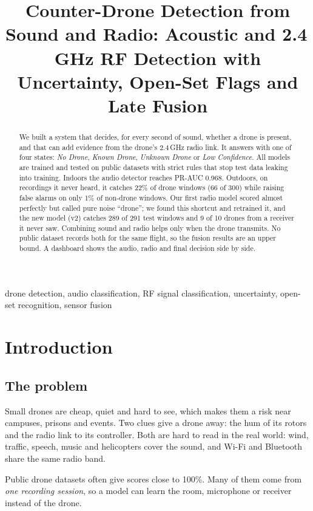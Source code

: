 \documentclass[conference,a4paper]{IEEEtran}
\title{Counter-Drone Detection from Sound and Radio: Acoustic and 2.4\,GHz RF Detection
with Uncertainty, Open-Set Flags and Late Fusion}
\author{\IEEEauthorblockN{Vidhi Rojasara (AU2644022) \qquad Kathan Desai (AU2644002)}
\IEEEauthorblockA{AI Lab, Course Instructor: Prof.\ Maitrik Shah\\
Ahmedabad University, Ahmedabad, India}}
\begin{document}
\maketitle

\begin{abstract}
We built a system that decides, for every second of sound, whether a drone is present, and that can
add evidence from the drone's 2.4\,GHz radio link. It answers with one of four states:
\emph{No Drone}, \emph{Known Drone}, \emph{Unknown Drone} or \emph{Low Confidence}. All models are
trained and tested on public datasets with strict rules that stop test data leaking into training.
Indoors the audio detector reaches PR-AUC 0.968. Outdoors, on recordings it never heard, it catches
22\% of drone windows (66 of 300) while raising false alarms on only 1\% of non-drone windows. Our
first radio model scored almost perfectly but called pure noise ``drone''; we found this shortcut and
retrained it, and the new model (v2) catches 289 of 291 test windows and 9 of 10 drones from a
receiver it never saw. Combining sound and radio helps only when the drone transmits. No public
dataset records both for the same flight, so the fusion results are an upper bound. A dashboard
shows the audio, radio and final decision side by side.
\end{abstract}

\begin{IEEEkeywords}
drone detection, audio classification, RF signal classification, uncertainty, open-set
recognition, sensor fusion
\end{IEEEkeywords}

\section{Introduction}

\subsection{The problem}
Small drones are cheap, quiet and hard to see, which makes them a risk near campuses, prisons and
events. Two clues give a drone away: the hum of its rotors and the radio link to its controller.
Both are hard to read in the real world: wind, traffic, speech, music and helicopters cover the
sound, and Wi-Fi and Bluetooth share the same radio band.

Public drone datasets often give scores close to 100\%. Many of them come from \emph{one recording
session}, so a model can learn the room, microphone or receiver instead of the drone.
\end{document}
